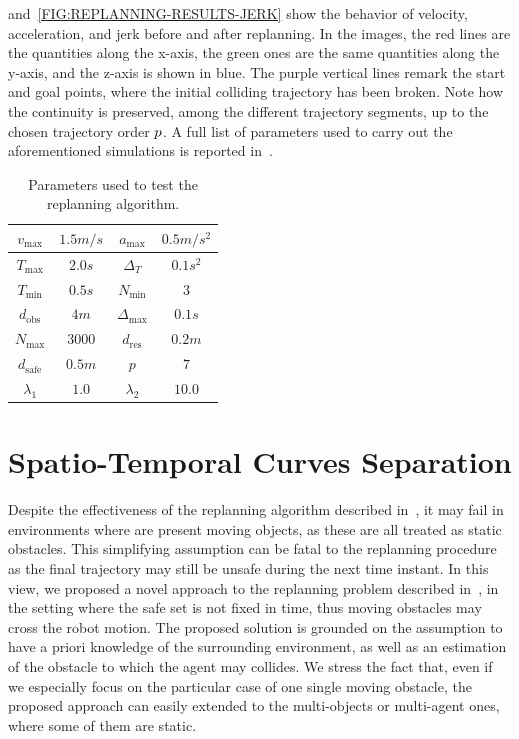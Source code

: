 and~\ref{FIG:REPLANNING-RESULTS-JERK} show the behavior of velocity, acceleration, and jerk before and after replanning.
In the images, the red lines are the quantities along the x-axis, the green ones are the same quantities along the y-axis, and the
z-axis is shown in blue. The purple vertical lines remark the start and goal points, where the initial colliding trajectory has been broken.
Note how the continuity is preserved, among the different trajectory segments, up to the chosen trajectory order $p$.
A full list of parameters used to carry out the aforementioned simulations is reported in~.
{
\renewcommand{\arraystretch}{1.35}
\begin{table}[b!]
    \centering
    \begin{tabular}{||c|c||c|c||}
        \hline
        \hline
        $v_{\text{max}}$ & $1.5m/s$ & $a_{\text{max}}$ & $0.5m/s^2$ \\
        \hline
        $T_{\text{max}}$ & $2.0s$ & $\Delta_T$ & $0.1s^2$ \\
        \hline
        $T_{\text{min}}$ & $0.5s$ & $N_{\text{min}}$ & $3$ \\
        \hline
        $d_{\text{obs}}$ & $4m$ & $\Delta_{\text{max}}$ & $0.1s$ \\
        \hline
        $N_{\text{max}}$ & $3000$ & $d_{\text{res}}$ & $0.2m$ \\
        \hline
        $d_{\text{safe}}$ & $0.5m$ & $p$ & $7$ \\
        \hline
        $\lambda_1$ & $1.0$ & $\lambda_2$ & $10.0$ \\
        \hline
        \hline
    \end{tabular}
    \caption{Parameters used to test the replanning algorithm.}%
	\label{TAB:REPLANNING-PARAMETERS}
\end{table}}

\section{Spatio-Temporal Curves Separation}%
\label{SEC:SPATION-TEMPORAL-SEPARATION} 
Despite the effectiveness of the replanning algorithm described in~, it may fail in environments where
are present moving objects, as these are all treated as static obstacles. This simplifying assumption can be fatal to the replanning procedure
as the final trajectory may still be unsafe during the next time instant.
In this view, we proposed a novel approach to the replanning problem described in~, in the
setting where the safe set is not fixed in time, thus moving obstacles may cross the robot motion.
The proposed solution is grounded on the assumption to have a priori knowledge of the surrounding environment, as well as an estimation
of the obstacle to which the agent may collides. We stress the fact that, even if we especially focus on the particular case of one single
moving obstacle, the proposed approach can easily extended to the multi-objects or multi-agent ones, where some of them are static.

